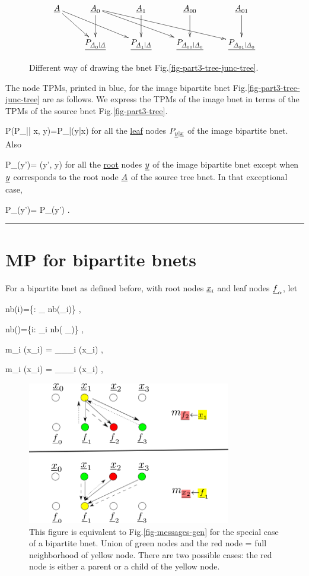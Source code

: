 \begin{figure}[h!]
\centering
$$\xymatrix{
\rvA\ar[dr]\ar[drr]
&\rvA_{0}\ar[d]\ar[drr]\ar[drrr]
&\rvA_{1}\ar[d]
&\rvA_{00}\ar[d]
&\rvA_{01}\ar[d]
\\
&\ul{P_{\rvA_{0}|\rvA}}
&\ul{P_{\rvA_{1}|\rvA}}
&\ul{P_{\rvA_{00}|\rvA_0}}
&\ul{P_{\rvA_{01}|\rvA_0}}
}$$
\caption{
Different
way of drawing 
the bnet Fig.\ref{fig-part3-tree-junc-tree}.}
\label{fig-part3-tree-bip-bnet}
\end{figure}

The node  TPMs, printed in blue,
for the image bipartite bnet 
Fig.\ref{fig-part3-tree-junc-tree}
are as follows. We express the
TPMs of the image bnet
in terms of the 
TPMs of the source bnet 
Fig.\ref{fig-part3-tree}.

\beq\color{blue}
P(P_{\rvy|\rvx}| x, y)=P_{\rvy|\rvx}(y|x)
\eeq
for all the
\ul{leaf} 
nodes $P_{{\underline{y}}|{\underline{x}}}$ of the
image bipartite bnet.
Also

\beq\color{blue}
P_\rvy(y')= \delta(y', y)
\;
\eeq
for all the \ul{root} nodes ${\underline{y}}$ of the
image bipartite bnet
except when 
${\underline{y}}$ corresponds to
the root node ${\underline{A}}$
of the source tree bnet.
In that exceptional case,

\beq\color{blue}
P_\rvy(y')= P_\rvA(y')
\;.
\eeq


\hrule


\section*{MP for
bipartite bnets}
For
a bipartite 
bnet as defined before,
with
root nodes ${\underline{x}}_i$
and leaf nodes ${\underline{f}}_\alpha$,
let


\beq
nb(i)=\{\alp: \rvf_\alpha\in
nb(\rvx_i)\}
\;,
\eeq

\beq
nb(\alpha)=\{i: \rvx_i\in
nb( \rvf_\alpha)\}
\;,
\eeq

\beq
m_{\alp\larrow i}
(x_i)
=
\pi_{\rvf_\alpha \lcond\rvx_i }
(x_i)
\;,
\eeq

\beq
m_{i\larrow \alp}
(x_i)
=
\lam_{\rvf_\alp\rcond \rvx_i}
(x_i)
\;,
\eeq


\begin{figure}[h!]
\centering
\includegraphics[width=3.5in]
{mpass/mpass-messages-bip.png}
\caption{This figure is equivalent to
Fig.\ref{fig-messages-gen}
for the special case of a 
bipartite bnet. Union of green nodes and the red node = full
 neighborhood of yellow node.
There are two possible 
cases:  the
red node is either a parent
or a child  of the yellow 
node.}  
\label{fig-messages-bip}
\end{figure}

